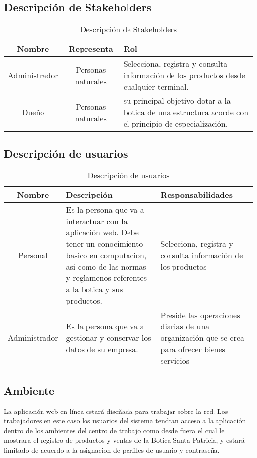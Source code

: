 \documentclass[a4paper,11pt, spanish]{report}
\begin{document}
{{      \subsection{Descripción de Stakeholders}
      
        {\renewcommand{\arraystretch}{1.7}%
        \noindent\begin{table}[H]
        \noindent\begin{tabularx}{\textwidth}{c|c|X}
          \textbf{{\large Nombre}} & \textbf{{\large Representa}} & \textbf{{\large Rol}} \\
          \hline
          Administrador & Personas naturales & Selecciona, registra y consulta información de los productos desde cualquier terminal.\\
          Dueño & Personas naturales & su principal objetivo dotar a la botica de una estructura acorde con el principio de especialización.\\
        \end{tabularx}
        \caption{Descripción de Stakeholders}
        \end{table}

      \subsection{Descripción de usuarios}
      
        {\renewcommand{\arraystretch}{1.7}%
        \noindent\begin{table}[H]
        \noindent\begin{tabularx}{\textwidth}{c|X|X}
          \textbf{{\large Nombre}} & \textbf{{\large Descripción}} & \textbf{{\large Responsabilidades}} \\
          \hline
          Personal & Es la persona que va a interactuar con la aplicación web. Debe tener un conocimiento basico en computacion, asi como de las normas y reglamenos referentes a la botica y sus productos. & Selecciona, registra y consulta información de los productos \\
          Administrador & Es la persona que va a gestionar y conservar los datos de su empresa. & Preside las operaciones diarias de una organización que se crea para ofrecer bienes servicios
        \end{tabularx}
        \caption{Descripción de usuarios}
        \end{table}
        
      \subsection{Ambiente}
        La aplicación web en línea estará diseñada para trabajar sobre la red. Los trabajadores
        en este caso los usuarios del sistema tendran acceso a la aplicación dentro de los ambientes del centro
        de trabajo como desde fuera el cual le mostrara el registro de productos y ventas de la Botica Santa Patricia,
        y estará limitado de acuerdo a la asignacion de perfiles de usuario y contraseña.

}}}}
\end{document}
